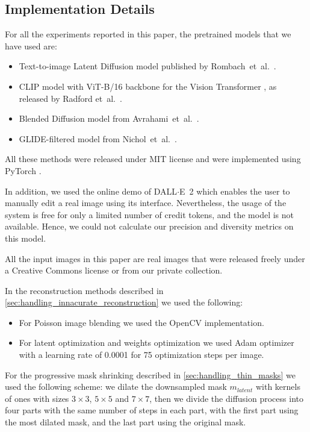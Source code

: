 \begin{appendix}
\section{Implementation Details}
\label{sec:implemenation_details}

For all the experiments reported in this paper, the pretrained models that we have used are:
\begin{itemize}
    \item Text-to-image Latent Diffusion model published by Rombach~et~al.~.
    \item CLIP model with ViT-B/16 backbone for the Vision Transformer \cite{dosovitskiy2020image}, as released by Radford et~al.~.
    \item Blended Diffusion model from Avrahami~et~al.~.
    \item GLIDE-filtered model from Nichol~et~al.~.
\end{itemize}

All these methods were released under MIT license and were implemented using PyTorch \cite{paszke2019pytorch}. 

In addition, we used the online demo of {DALL$\cdot$E}~2 \cite{dalle2_demo} which enables the user to manually edit a real image using its interface. Nevertheless, the usage of the system is free for only a limited number of credit tokens, and the model is not available. Hence, we could not calculate our precision and diversity metrics on this model.

All the input images in this paper are real images that were released freely under a Creative Commons license or from our private collection.

In the reconstruction methods described in
\ref{sec:handling_innacurate_reconstruction}
we used the following:
\begin{itemize}
    \item For Poisson image blending \cite{perez2003poisson} we used the OpenCV \cite{bradski2000opencv} implementation.
    \item For latent optimization and weights optimization we used Adam optimizer \cite{kingma2014adam} with a learning rate of 0.0001 for 75 optimization steps per image.
\end{itemize}

For the progressive mask shrinking described in
\ref{sec:handling_thin_masks}
we used the following scheme: we dilate the downsampled mask $m_{\textit{latent}}$ with kernels of ones with sizes $3 \times 3$, $5 \times 5$ and $7 \times 7$, then we divide the diffusion process into four parts with the same number of steps in each part, with the first part using the most dilated mask, and the last part using the original mask.


\end{appendix}
